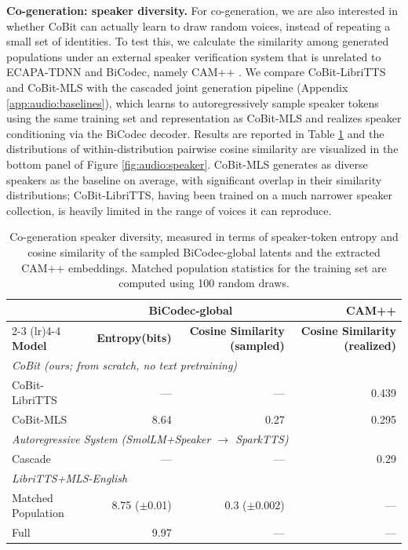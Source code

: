 \textbf{Co-generation: speaker diversity.} For co-generation, we are also interested in whether CoBit can actually learn to draw random voices, instead of repeating a small set of identities. To test this, we calculate the similarity among generated populations under an external speaker verification system that is unrelated to ECAPA-TDNN and BiCodec, namely CAM++ \citep{audio:campp}. We compare CoBit-LibriTTS and CoBit-MLS with the cascaded joint generation pipeline (Appendix \ref{app:audio:baselines}), which learns to autoregressively sample speaker tokens using the same training set and representation as CoBit-MLS and realizes speaker conditioning via the BiCodec decoder. Results are reported in Table \ref{tab:audio:diversity} and the distributions of within-distribution pairwise cosine similarity are visualized in the bottom panel of Figure \ref{fig:audio:speaker}. CoBit-MLS generates as diverse speakers as the baseline on average, with significant overlap in their similarity distributions; CoBit-LibriTTS, having been trained on a much narrower speaker collection, is heavily limited in the range of voices it can reproduce.

\begin{table}[t]
\centering
\footnotesize
\setlength{\tabcolsep}{4pt}
\begin{tabular}{lrrr}
\toprule
& \multicolumn{2}{c}{\textbf{BiCodec-global}} & \textbf{CAM++} \\
\cmidrule(lr){2-3} \cmidrule(lr){4-4}
\textbf{Model} & \textbf{Entropy(bits)} & \textbf{Cosine Similarity (sampled)} & \textbf{Cosine Similarity (realized)} \\
\midrule
\multicolumn{4}{l}{\emph{CoBit (ours; from scratch, no text pretraining)}} \\
CoBit-LibriTTS & --- & --- & 0.439 \\
CoBit-MLS & 8.64 & 0.27 & 0.295 \\
\midrule
\multicolumn{4}{l}{\emph{Autoregressive System (SmolLM+Speaker $\rightarrow$ SparkTTS)}} \\
Cascade & --- & --- & 0.29 \\
\midrule
\multicolumn{4}{l}{\emph{LibriTTS+MLS-English}} \\
Matched Population & 8.75 ($\pm$0.01) & 0.3 ($\pm$0.002) & --- \\
Full & 9.97 & --- & ---\\
\bottomrule
\end{tabular}
\caption{Co-generation speaker diversity, measured in terms of speaker-token entropy and cosine similarity of the sampled BiCodec-global latents and the extracted CAM++ embeddings. Matched population statistics for the training set are computed using 100 random draws.}
\label{tab:audio:diversity}
\end{table}

